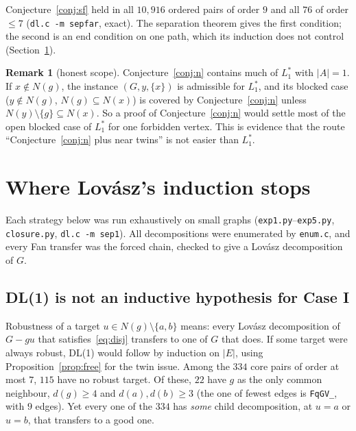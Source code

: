 \documentclass[11pt]{amsart}
\theoremstyle{definition}
\newtheorem{remark}[theorem]{Remark}
\begin{document}
Conjecture~\ref{conj:sf} held in all $10{,}916$ ordered pairs of order $9$ and all $76$ of order
$\le7$ (\texttt{dl.c -m sepfar}, exact). The separation theorem gives the first condition; the
second is an end condition on one path, which its induction does not control
(Section~\ref{sec:residual}).

\begin{remark}[honest scope]
Conjecture~\ref{conj:n} contains much of $L_1^*$ with $|A|=1$. If $x\notin N(g)$, the instance
$(G,y,\{x\})$ is admissible for $L_1^*$, and its blocked case ($y\notin N(g)$, $N(g)\subseteq N(x)$) is
covered by Conjecture~\ref{conj:n} unless $N(y)\setminus\{g\}\subseteq N(x)$. So a proof of
Conjecture~\ref{conj:n} would settle most of the open blocked case of $L_1^*$ for one forbidden vertex.
This is evidence that the route ``Conjecture~\ref{conj:n} plus near twins'' is not easier than
$L_1^*$.
\end{remark}

\section{Where Lov\'asz's induction stops}\label{sec:residual}

Each strategy below was run exhaustively on small graphs (\texttt{exp1.py}--\texttt{exp5.py},
\texttt{closure.py}, \texttt{dl.c -m sep1}). All decompositions were enumerated by \texttt{enum.c}, and
every Fan transfer was the forced chain, checked to give a Lov\'asz decomposition of $G$.

\subsection{DL(1) is not an inductive hypothesis for Case I}
Robustness of a target $u\in N(g)\setminus\{a,b\}$ means: every Lov\'asz decomposition of $G-gu$
that satisfies~\eqref{eq:disj} transfers to one of $G$ that does. If some target were always robust,
DL(1) would follow by induction on $|E|$, using Proposition~\ref{prop:free} for the twin issue. Among
the $334$ core pairs of order at most $7$, $115$ have no robust target. Of these, $22$ have $g$ as the only
common neighbour, $d(g)\ge4$ and $d(a),d(b)\ge3$ (the one of fewest edges is \texttt{FqGV\_}, with
$9$ edges). Yet every one of the $334$ has \emph{some} child
decomposition, at $u=a$ or $u=b$, that transfers to a good one.
\end{document}

